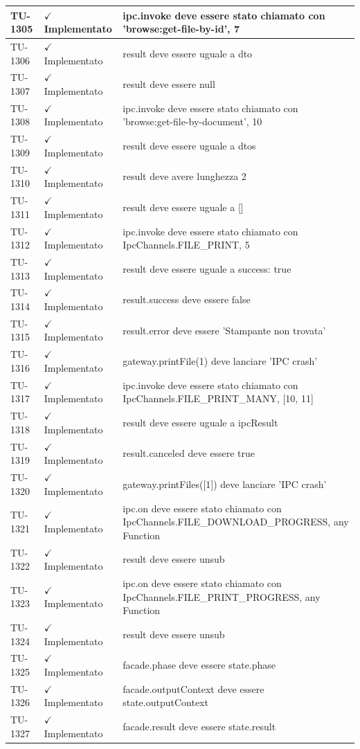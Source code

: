 ﻿\documentclass[a4paper,12pt]{article}
\newcommand{\ok}{\textcolor{green!60!black}{$\checkmark$ Implementato}}
\begin{document}
\begin{longtable}{|p{2cm}|p{3.5cm}|p{9.5cm}|}
\hline
TU-1305 & \ok & ipc.invoke deve essere stato chiamato con 'browse:get-file-by-id', 7 \\
\hline
TU-1306 & \ok & result deve essere uguale a dto \\
\hline
TU-1307 & \ok & result deve essere null \\
\hline
TU-1308 & \ok & ipc.invoke deve essere stato chiamato con 'browse:get-file-by-document', 10 \\
\hline
TU-1309 & \ok & result deve essere uguale a dtos \\
\hline
TU-1310 & \ok & result deve avere lunghezza 2 \\
\hline
TU-1311 & \ok & result deve essere uguale a [] \\
\hline
TU-1312 & \ok & ipc.invoke deve essere stato chiamato con IpcChannels.FILE\_PRINT, 5 \\
\hline
TU-1313 & \ok & result deve essere uguale a { success: true } \\
\hline
TU-1314 & \ok & result.success deve essere false \\
\hline
TU-1315 & \ok & result.error deve essere 'Stampante non trovata' \\
\hline
TU-1316 & \ok & gateway.printFile(1) deve lanciare 'IPC crash' \\
\hline
TU-1317 & \ok & ipc.invoke deve essere stato chiamato con IpcChannels.FILE\_PRINT\_MANY, [10, 11] \\
\hline
TU-1318 & \ok & result deve essere uguale a ipcResult \\
\hline
TU-1319 & \ok & result.canceled deve essere true \\
\hline
TU-1320 & \ok & gateway.printFiles([1]) deve lanciare 'IPC crash' \\
\hline
TU-1321 & \ok & ipc.on deve essere stato chiamato con IpcChannels.FILE\_DOWNLOAD\_PROGRESS, any Function \\
\hline
TU-1322 & \ok & result deve essere unsub \\
\hline
TU-1323 & \ok & ipc.on deve essere stato chiamato con IpcChannels.FILE\_PRINT\_PROGRESS, any Function \\
\hline
TU-1324 & \ok & result deve essere unsub \\
\hline
TU-1325 & \ok & facade.phase deve essere state.phase \\
\hline
TU-1326 & \ok & facade.outputContext deve essere state.outputContext \\
\hline
TU-1327 & \ok & facade.result deve essere state.result \\

\end{longtable}
\end{document}
